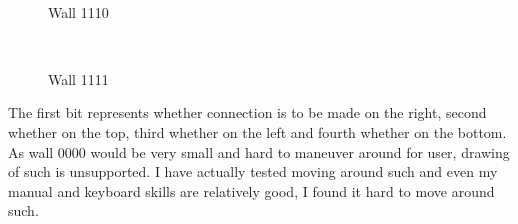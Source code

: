 \documentclass[11pt,a4paper,notitlepage]{report}
\newenvironment{img}{
	\begin{center}
		\begin{figure}[H]
			\begin{center}
			
}{
	\end{center}
		\end{figure}
			\end{center}
}
\begin{document}
				\begin{img}
					\\
					\caption{Wall 1110}
				\end{img}
				\begin{img}
					\\
					\caption{Wall 1111}
				\end{img}
				
			
				The first bit represents whether connection is to be made on the right, second whether on the top, third whether on the left and fourth whether on the bottom. As wall 0000 would be very small and hard to maneuver around for user, drawing of such is unsupported. I have actually tested moving around such and even my manual and keyboard skills are relatively good, I found it hard to move around such.
				
\end{document}

